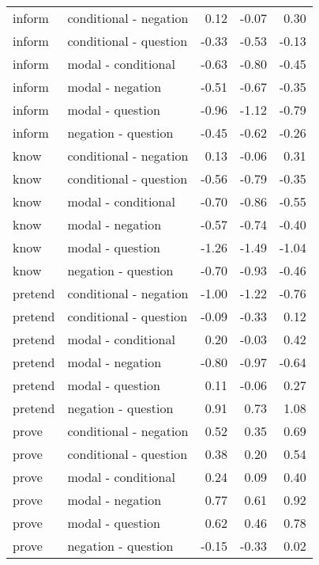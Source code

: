 \documentclass[11pt,fleqn]{article}
\newcommand{\6}{\mbox{$[\hspace*{-.6mm}[$}}
\newcommand{\9}{\mbox{$]\hspace*{-.6mm}]$}}
\begin{document}
\begin{longtable}{llrrr}
      inform & conditional - negation & 0.12 & -0.07 & 0.30 \\ 
      inform & conditional - question & -0.33 & -0.53 & -0.13 \\ 
      inform & modal - conditional & -0.63 & -0.80 & -0.45 \\ 
      inform & modal - negation & -0.51 & -0.67 & -0.35 \\ 
      inform & modal - question & -0.96 & -1.12 & -0.79 \\ 
      inform & negation - question & -0.45 & -0.62 & -0.26 \\ \midrule

      know & conditional - negation & 0.13 & -0.06 & 0.31 \\ 
      know & conditional - question & -0.56 & -0.79 & -0.35 \\ 
      know & modal - conditional & -0.70 & -0.86 & -0.55 \\ 
      know & modal - negation & -0.57 & -0.74 & -0.40 \\ 
      know & modal - question & -1.26 & -1.49 & -1.04 \\ 
      know & negation - question & -0.70 & -0.93 & -0.46 \\ \midrule

      pretend & conditional - negation & -1.00 & -1.22 & -0.76 \\ 
      pretend & conditional - question & -0.09 & -0.33 & 0.12 \\ 
      pretend & modal - conditional & 0.20 & -0.03 & 0.42 \\ 
      pretend & modal - negation & -0.80 & -0.97 & -0.64 \\ 
      pretend & modal - question & 0.11 & -0.06 & 0.27 \\ 
      pretend & negation - question & 0.91 & 0.73 & 1.08 \\ \midrule

      prove & conditional - negation & 0.52 & 0.35 & 0.69 \\ 
      prove & conditional - question & 0.38 & 0.20 & 0.54 \\ 
      prove & modal - conditional & 0.24 & 0.09 & 0.40 \\ 
      prove & modal - negation & 0.77 & 0.61 & 0.92 \\ 
      prove & modal - question & 0.62 & 0.46 & 0.78 \\ 
      prove & negation - question & -0.15 & -0.33 & 0.02 \\ \midrule


\end{longtable}
\end{document}
